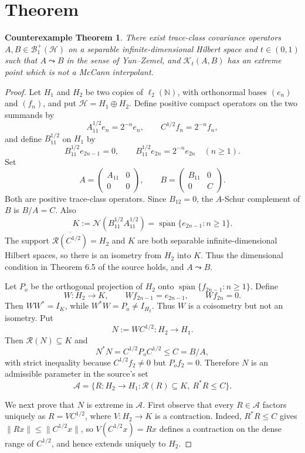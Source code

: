 \documentclass[11pt]{article}
\newtheorem*{theorem}{Counterexample Theorem}
\newcommand{\HH}{\mathcal H}
\newcommand{\KK}{\mathcal K}
\newcommand{\NN}{\mathbb N}
\newcommand{\cA}{\mathcal A}
\newcommand{\cR}{\mathcal R}
\newcommand{\cN}{\mathcal N}
\newcommand{\cB}{\mathcal B}
\begin{document}
\section*{Theorem}

\begin{theorem}
There exist trace-class covariance operators \(A,B\in\cB_1^+(\HH)\) on a
separable infinite-dimensional Hilbert space and \(t\in(0,1)\) such that
\(A\leadsto B\) in the sense of Yun--Zemel, and \(\KK_t(A,B)\) has an extreme
point which is not a McCann interpolant.
\end{theorem}

\begin{proof}
Let \(H_1\) and \(H_2\) be two copies of \(\ell_2(\NN)\), with orthonormal
bases \((e_n)\) and \((f_n)\), and put \(\HH=H_1\oplus H_2\).  Define
positive compact operators on the two summands by
\[
  A_{11}^{1/2}e_n=2^{-n}e_n,\qquad
  C^{1/2}f_n=2^{-n}f_n,
\]
and define \(B_{11}^{1/2}\) on \(H_1\) by
\[
  B_{11}^{1/2}e_{2n-1}=0,\qquad
  B_{11}^{1/2}e_{2n}=2^{-n}e_{2n}\quad(n\geq1).
\]
Set
\[
  A=\begin{pmatrix}A_{11}&0\\0&0\end{pmatrix},
  \qquad
  B=\begin{pmatrix}B_{11}&0\\0&C\end{pmatrix}.
\]
Both are positive trace-class operators.  Since \(B_{12}=0\), the
\(A\)-Schur complement of \(B\) is \(B/A=C\).  Also
\[
  K:=\cN(B_{11}^{1/2}A_{11}^{1/2})
    =\overline{\operatorname{span}}\{e_{2n-1}:n\geq1\}.
\]
The support \(\overline{\cR(C^{1/2})}=H_2\) and \(K\) are both separable
infinite-dimensional Hilbert spaces, so there is an isometry from \(H_2\) into
\(K\).  Thus the dimensional condition in Theorem 6.5 of the source holds, and
\(A\leadsto B\).

Let \(P_o\) be the orthogonal projection of \(H_2\) onto
\(\overline{\operatorname{span}}\{f_{2n-1}:n\geq1\}\).  Define
\[
  W:H_2\to K,\qquad W f_{2n-1}=e_{2n-1},\qquad W f_{2n}=0.
\]
Then \(WW^*=I_K\), while \(W^*W=P_o\neq I_{H_2}\).  Thus \(W\) is a
coisometry but not an isometry.  Put
\[
  N:=WC^{1/2}:H_2\to H_1.
\]
Then \(\cR(N)\subseteq K\) and
\[
  N^*N=C^{1/2}P_oC^{1/2}\leq C=B/A,
\]
with strict inequality because \(C^{1/2}f_2\neq0\) but \(P_of_2=0\).
Therefore \(N\) is an admissible parameter in the source's set
\[
  \cA=\{R:H_2\to H_1:\cR(R)\subseteq K,\ R^*R\leq C\}.
\]

We next prove that \(N\) is extreme in \(\cA\).  First observe that every
\(R\in\cA\) factors uniquely as \(R=VC^{1/2}\), where \(V:H_2\to K\) is a
contraction.  Indeed, \(R^*R\leq C\) gives
\(\|Rx\|\leq\|C^{1/2}x\|\), so \(V(C^{1/2}x)=Rx\) defines a contraction on the
dense range of \(C^{1/2}\), and hence extends uniquely to \(H_2\).


\end{proof}
\end{document}
